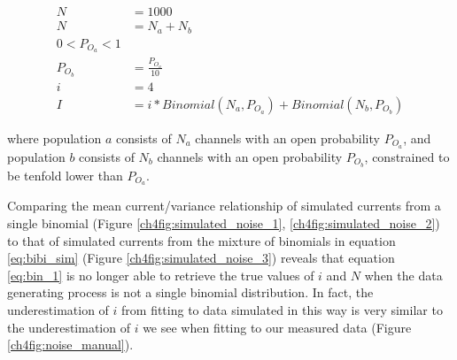 \begin{equation}\label{eq:bibi_sim}
\begin{split}
	N &= 1000 \\
	N &= N_a + N_b \\
	0 < P_{O_{a}} < 1 \\
	P_{O_{b}} &= \frac{P_{O_{a}}}{10} \\
	i &= 4 \\
	I &= i * Binomial(N_a, P_{O_{a}}) + Binomial(N_b, P_{O_{b}})
\end{split}
\end{equation}

where population $a$ consists of $N_a$ channels with an open probability $P_{O_{a}}$, and population $b$ consists of $N_b$ channels with an open probability $P_{O_{b}}$, constrained to be tenfold lower than $P_{O_{a}}$.

Comparing the mean current/variance relationship of simulated currents from a single binomial (Figure \ref{ch4fig:simulated_noise_1}, \ref{ch4fig:simulated_noise_2}) to that of simulated currents from the mixture of binomials in equation \ref{eq:bibi_sim} (Figure \ref{ch4fig:simulated_noise_3}) reveals that equation \ref{eq:bin_1} is no longer able to retrieve the true values of $i$ and $N$ when the data generating process is not a single binomial distribution.
In fact, the underestimation of $i$ from fitting to data simulated in this way is very similar to the underestimation of $i$ we see when fitting to our measured data (Figure \ref{ch4fig:noise_manual}).

